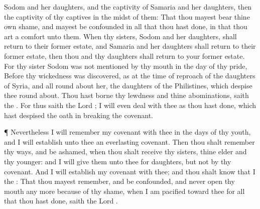 {Sodom and her
daughters, and the
captivity of
Samaria and her
daughters, then
{} the
captivity of thy
captives in the
midst of them:
That thou mayest
bear thine own
shame, and mayest be
confounded in all that thou hast
done, in that thou art a
comfort unto them.
When thy
sisters,
Sodom and her
daughters, shall
return to their former
estate, and
Samaria and her
daughters shall
return to their former
estate, then thou and thy
daughters shall
return to your former
estate.
For thy
sister
Sodom was not
mentioned by thy
mouth in the
day of thy
pride,
Before thy
wickedness was
discovered, as at the
time of
{}
reproach of the
daughters of
Syria, and all
{} round
about her, the
daughters of the
Philistines, which
despise thee round
about.
Thou hast
borne thy
lewdness and thine
abominations,
saith the
{}.
For thus
saith the
Lord
{}; I will even
deal with thee as thou hast
done, which hast
despised the
oath in
breaking the
covenant.
\par }{\PP {}¶ Nevertheless I will
remember my
covenant with thee in the
days of thy
youth, and I will
establish unto thee an
everlasting
covenant.
Then thou shalt
remember thy
ways, and be
ashamed, when thou shalt
receive thy
sisters, thine
elder and thy
younger: and I will
give them unto thee for
daughters, but not by thy
covenant.
And I will
establish my
covenant with thee; and thou shalt
know that I
{} the
{}:
That thou mayest
remember, and be
confounded, and never
open thy
mouth any more
because of thy
shame, when I am
pacified toward thee for all that thou hast
done,
saith the
Lord
{}.

}
